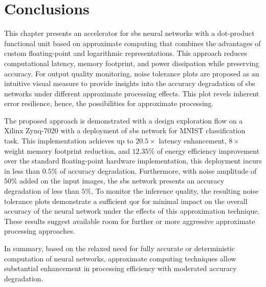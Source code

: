 \section{Conclusions}
\label{sec:conclusions}
This chapter presents an accelerator for \gls{sbs} neural networks with a dot-product functional unit based on approximate computing that combines the advantages of custom floating-point and logarithmic representations. This approach reduces computational latency, memory footprint, and power dissipation while preserving accuracy. For output quality monitoring, noise tolerance plots are proposed as an intuitive visual measure to provide insights into the accuracy degradation of \gls{sbs} networks under different approximate processing effects. This plot revels inherent error resilience, hence, the possibilities for approximate processing.


The proposed approach is demonstrated with a design exploration flow on a Xilinx Zynq-7020 with a deployment of \gls{sbs} network for MNIST classification task. This implementation achieves up to $20.5\times$ latency enhancement, $8\times$ weight memory footprint reduction, and $12.35\%$ of energy efficiency improvement over the standard floating-point hardware implementation, this deployment incurs in less than $0.5\%$ of accuracy degradation. Furthermore, with noise amplitude of $50\%$ added on the input images, the \gls{sbs} network presents an accuracy degradation of less than $5\%$. To monitor the inference quality, the resulting noise tolerance plots demonstrate a sufficient \gls{qor} for minimal impact on the overall accuracy of the neural network under the effects of this approximation technique. These results suggest available room for further or more aggressive approximate processing approaches.


In summary, based on the relaxed need for fully accurate or deterministic computation of neural networks, approximate computing techniques allow substantial enhancement in processing efficiency with moderated accuracy degradation.
